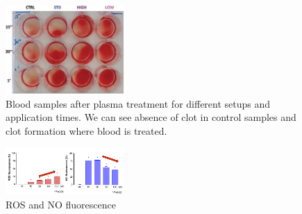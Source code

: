 \begin{figure}
 \centering
 \includegraphics[width=0.4\textwidth]{Images/Intro/blood_sample.png}
 \caption{Blood samples after plasma treatment for different setups and application times. We can see absence of clot in control samples and clot formation where blood is treated.}
 \label{fig:samples}
\end{figure}

\begin{figure}
 \centering
 \includegraphics[width=0.4\textwidth]{Images/Intro/ROS.png}
 \caption{ROS and NO fluorescence }
 \label{fig:samples}
\end{figure}
